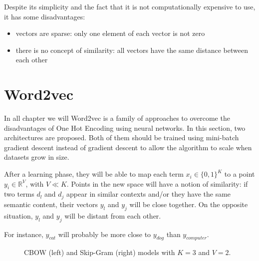 Despite its simplicity and the fact that it is not computationally expensive to use, it has some disadvantages:
\begin{itemize}
    \item vectors are sparse: only one element of each vector is not zero
    \item there is no concept of similarity: all vectors have the same distance between each other
\end{itemize}

\section{Word2vec}
In all chapter we will
Word2vec is a family of approaches to overcome the disadvantages of One Hot Encoding using neural networks.
In this section, two architectures are proposed.
Both of them should be trained using mini-batch gradient descent instead of gradient descent to allow the algorithm to scale when datasets grow in size.

After a learning phase, they will be able to map each term $x_i \in \{0, 1\}^K$ to a point $y_i \in \mathbb{R}^V$, with $V \ll K$.
Points in the new space will have a notion of similarity:
if two terms $d_l$ and $d_j$ appear in similar contexts and/or they have the same semantic content,
their vectors $y_l$ and $y_j$ will be close together.
On the opposite situation, $y_l$ and $y_j$ will be distant from each other.

For instance, $y_{cat}$ will probably be more close to $y_{dog}$ than $y_{computer}$.

\begin{figure}[h]
    \centering
    \hfill
    \caption{CBOW (left) and Skip-Gram (right) models with $K=3$ and $V=2$.}
    \label{fig:nnwemb}
\end{figure}

